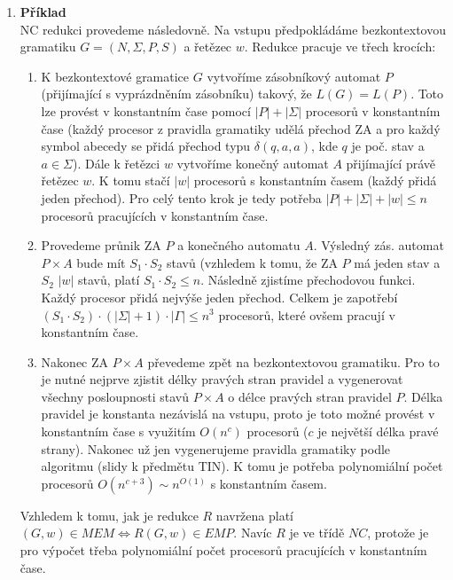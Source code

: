 \documentclass[a4paper,12pt]{article}
\begin{document}
\begin{enumerate}[label=\textbf{\arabic*}.]
 \item {\bfseries Příklad}\\
  NC redukci provedeme následovně. Na vstupu předpokládáme bezkontextovou gramatiku $G = (N, \Sigma, P, S)$ a řetězec $w$.
  Redukce pracuje ve třech krocích:
  \begin{enumerate}
   \item K bezkontextové gramatice $G$ vytvoříme zásobníkový automat $P$ (přijímající s vyprázdněním zásobníku) takový,
     že $L(G) = L(P)$. Toto lze provést v konstantním čase pomocí $|P| + |\Sigma|$ procesorů v konstantním čase
     (každý procesor z pravidla gramatiky udělá přechod ZA a pro každý symbol abecedy se přidá přechod typu $\delta(q,a,a)$, 
     kde $q$ je poč. stav a $a\in\Sigma$). Dále k řetězci $w$ vytvoříme konečný automat $A$ přijímající právě řetězec $w$.
     K tomu stačí $|w|$ procesorů s konstantním časem (každý přidá jeden přechod). Pro celý tento krok je tedy potřeba $|P| + |\Sigma| + |w| \leq n$
     procesorů pracujících v konstantním čase.
   \item Provedeme průnik ZA $P$ a konečného automatu $A$. Výsledný zás. automat $P\times A$ bude mít $S_1\cdot S_2$ stavů (vzhledem k tomu, že
   ZA $P$ má jeden stav a $S_2$ $|w|$ stavů, platí $S_1\cdot S_2 \leq n$. Následně zjistíme přechodovou funkci. Každý procesor
   přidá nejvýše jeden přechod. Celkem je zapotřebí $(S_1\cdot S_2)\cdot (|\Sigma| + 1)\cdot |\Gamma| \leq n^3$ procesorů, které
   ovšem pracují v konstantním čase.
   \item Nakonec ZA $P\times A$ převedeme zpět na bezkontextovou gramatiku. Pro to je nutné nejprve zjistit délky pravých stran pravidel a 
   vygenerovat všechny posloupnosti stavů $P\times A$ o délce pravých stran pravidel $P$. Délka pravidel je konstanta nezávislá
   na vstupu, proto je toto možné provést v konstantním čase s využitím $O(n^c)$ procesorů ($c$ je největší délka pravé strany).
   Nakonec už jen vygenerujeme pravidla gramatiky podle algoritmu (slidy k předmětu TIN). K tomu je potřeba polynomiální počet procesorů $O(n^{c+3}) \sim n^{O(1)}$
   s konstantním časem.
  \end{enumerate}
 Vzhledem k tomu, jak je redukce $R$ navržena platí $(G,w) \in MEM \Leftrightarrow R(G, w) \in EMP$. Navíc $R$ je ve třídě $NC$,
 protože je pro výpočet třeba polynomiální počet procesorů pracujících v konstantním čase.
  
\end{enumerate}
\end{document}
